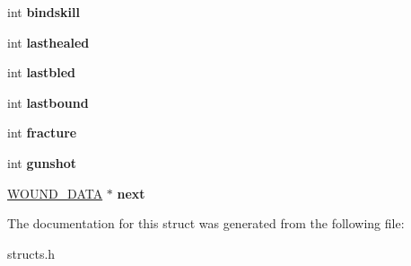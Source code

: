 \begin{DoxyCompactItemize}
\item 
\hypertarget{structwound__data_a5125718894a9abf21860c54d2cc72549}{int {\bfseries bindskill}}\label{structwound__data_a5125718894a9abf21860c54d2cc72549}

\item 
\hypertarget{structwound__data_a1ab905e77555a860ba18fe5989ed7324}{int {\bfseries lasthealed}}\label{structwound__data_a1ab905e77555a860ba18fe5989ed7324}

\item 
\hypertarget{structwound__data_a588ef2d4af6aa25b0f261d647dbee9f8}{int {\bfseries lastbled}}\label{structwound__data_a588ef2d4af6aa25b0f261d647dbee9f8}

\item 
\hypertarget{structwound__data_aafcdf74603ffe58b8c6b6f6ac37d6fc1}{int {\bfseries lastbound}}\label{structwound__data_aafcdf74603ffe58b8c6b6f6ac37d6fc1}

\item 
\hypertarget{structwound__data_a6df02e8d8a22003c56b69d4ed5200bf6}{int {\bfseries fracture}}\label{structwound__data_a6df02e8d8a22003c56b69d4ed5200bf6}

\item 
\hypertarget{structwound__data_a29aecddb9188f1fcbe5d911608cc7a42}{int {\bfseries gunshot}}\label{structwound__data_a29aecddb9188f1fcbe5d911608cc7a42}

\item 
\hypertarget{structwound__data_ae32ec87ea6c38e7cd0cf1b210005d46d}{\hyperlink{structwound__data}{W\-O\-U\-N\-D\-\_\-\-D\-A\-T\-A} $\ast$ {\bfseries next}}\label{structwound__data_ae32ec87ea6c38e7cd0cf1b210005d46d}

\end{DoxyCompactItemize}


The documentation for this struct was generated from the following file\-:\begin{DoxyCompactItemize}
\item 
structs.\-h\end{DoxyCompactItemize}
